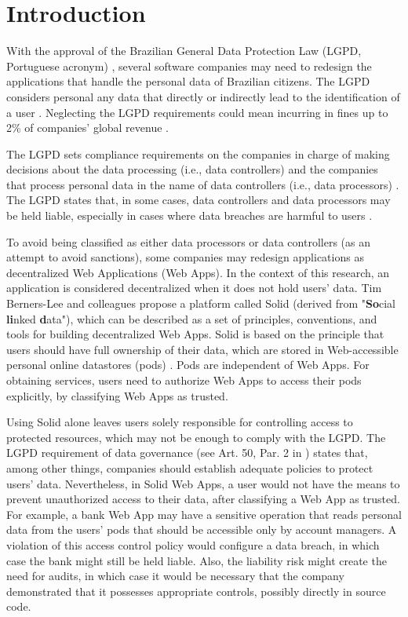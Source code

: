 \documentclass[sigconf]{acmart}
\begin{document}
\section{Introduction}

With the approval of the Brazilian General Data Protection Law (LGPD, Portuguese acronym) \cite{LGPD18}, several software companies may need to redesign the applications that handle the personal data of Brazilian citizens. The LGPD considers personal any data that directly or indirectly lead to the identification of a user \cite{LGPD18}. Neglecting the LGPD requirements could mean incurring in fines up to 2\% of companies' global revenue \cite{LGPD18}.

The LGPD sets compliance requirements on the companies in charge of making decisions about the data processing (i.e., data controllers) and the companies that process personal data in the name of data controllers (i.e., data processors) \cite{LGPD18}. The LGPD states that, in some cases, data controllers and data processors may be held liable, especially in cases where data breaches are harmful to users \cite{LGPD18}.

To avoid being classified as either data processors or data controllers (as an attempt to avoid sanctions), some companies may redesign applications as decentralized Web Applications (Web Apps). In the context of this research, an application is considered decentralized when it does not hold users' data. Tim Berners-Lee and colleagues \cite{Sambra} propose a platform called Solid (derived from "\textbf{So}cial \textbf{li}nked \textbf{d}ata"), which can be described as a set of principles, conventions, and tools for building decentralized Web Apps. Solid is based on the principle that users should have full ownership of their data, which are stored in Web-accessible personal online datastores (pods) \cite{Sambra}. Pods are independent of Web Apps. For obtaining services, users need to authorize Web Apps to access their pods explicitly, by classifying Web Apps as trusted.

Using Solid alone leaves users solely responsible for controlling access to protected resources, which may not be enough to comply with the LGPD. The LGPD requirement of data governance (see Art. 50, Par. 2 in \cite{LGPD18}) states that, among other things, companies should establish adequate policies to protect users' data. Nevertheless, in Solid Web Apps, a user would not have the means to prevent unauthorized access to their data, after classifying a Web App as trusted. For example, a bank Web App may have a sensitive operation that reads personal data from the users' pods that should be accessible only by account managers. A violation of this access control policy would configure a data breach, in which case the bank might still be held liable. Also, the liability risk might create the need for audits, in which case it would be necessary that the company demonstrated that it possesses appropriate controls, possibly directly in source code.
\end{document}
